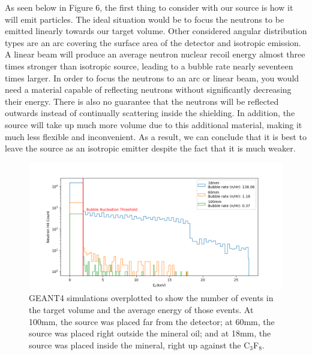 \documentclass[%
12pt,
twoside,
reprint,
amsmath,amssymb,
aps,
]{article}
\begin{document}
	\par As seen below in Figure 6, the first thing to consider with our source is how it will emit particles. The ideal situation would be to focus the neutrons to be emitted linearly towards our target volume. Other considered angular distribution types are an arc covering the surface area of the detector and isotropic emission. A linear beam will produce an average neutron nuclear recoil energy almost three times stronger than isotropic source, leading to a bubble rate nearly seventeen times larger. In order to focus the neutrons to an arc or linear beam, you would need a material capable of reflecting neutrons without significantly decreasing their energy. There is also no guarantee that the neutrons will be reflected outwards instead of continually scattering inside the shielding. In addition, the source will take up much more volume due to this additional material, making it much less flexible and inconvenient. As a result, we can conclude that it is best to leave the source as an isotropic emitter despite the fact that it is much weaker.

	\begin{figure}[!b]
		\includegraphics[scale = 0.6, center]{Images/distance_log.png}
		\caption{\label{tab:table-name} GEANT4 simulations overplotted to show the number of events in the target volume and the average energy of those events. At 100mm, the source was placed far from the detector; at 60mm, the source was placed right outside the mineral oil; and at 18mm, the source was placed inside the mineral, right up against the C$_{3}$F$_{8}$.}
	\end{figure}
	
\end{document}
